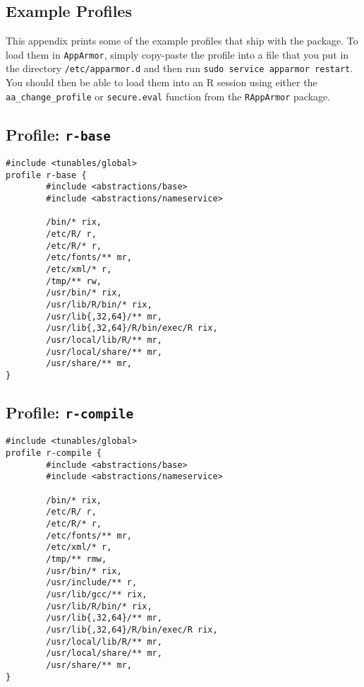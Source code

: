 \documentclass[article]{jss}
\newcommand{\R}{\textsf{R}\xspace}
\newcommand{\AppArmor}{\texttt{AppArmor}\xspace}
\newcommand{\RAppArmor}{\pkg{RAppArmor}\xspace}
\begin{document}
\begin{appendices}
\section{Example Profiles}

This appendix prints some of the example profiles that ship with the
\RAppArmor package. To load them in \AppArmor, simply copy-paste the
profile into a file that you put in the directory \texttt{/etc/apparmor.d} and
then run \texttt{sudo service apparmor restart}. You should then be able to load
them into an \R session using either the \texttt{aa\_change\_profile}
or \texttt{secure.eval} function from the \texttt{RAppArmor} package.

\subsection[Profile: r-base]{Profile: \texttt{r-base}}
\label{r-base}

\begin{verbatim}
#include <tunables/global>
profile r-base {
        #include <abstractions/base>
        #include <abstractions/nameservice>

        /bin/* rix,
        /etc/R/ r,
        /etc/R/* r,
        /etc/fonts/** mr,
        /etc/xml/* r,
        /tmp/** rw,
        /usr/bin/* rix,
        /usr/lib/R/bin/* rix,
        /usr/lib{,32,64}/** mr,
        /usr/lib{,32,64}/R/bin/exec/R rix,
        /usr/local/lib/R/** mr,
        /usr/local/share/** mr,
        /usr/share/** mr,
}
\end{verbatim}


\subsection[Profile: r-compile]{Profile: \texttt{r-compile}}
\label{r-compile}

\begin{verbatim}
#include <tunables/global>
profile r-compile {
        #include <abstractions/base>
        #include <abstractions/nameservice>

        /bin/* rix,
        /etc/R/ r,
        /etc/R/* r,
        /etc/fonts/** mr,
        /etc/xml/* r,
        /tmp/** rmw,
        /usr/bin/* rix,
        /usr/include/** r,
        /usr/lib/gcc/** rix,		
        /usr/lib/R/bin/* rix,
        /usr/lib{,32,64}/** mr,
        /usr/lib{,32,64}/R/bin/exec/R rix,
        /usr/local/lib/R/** mr,
        /usr/local/share/** mr,
        /usr/share/** mr,
}
\end{verbatim}


\end{appendices}
\end{document}
